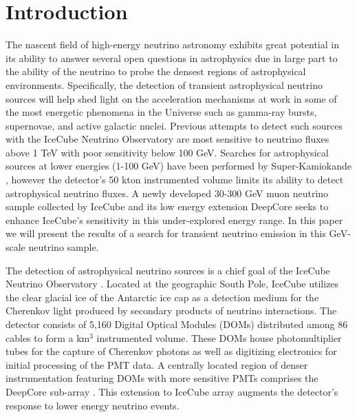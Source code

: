 \documentclass[manuscript]{aastex}
\begin{document}
\section{Introduction}
The nascent field of high-energy neutrino astronomy exhibits great potential in its ability to answer several open questions in astrophysics due in large part to the ability of the neutrino to probe the densest regions of astrophysical environments. Specifically, the detection of transient astrophysical neutrino sources will help shed light on the acceleration mechanisms at work in some of the most energetic phenomena in the Universe such as gamma-ray bursts, supernovae, and active galactic nuclei. Previous attempts to detect such sources with the IceCube Neutrino Observatory \citep{2006APh....26..155I} are most sensitive to neutrino fluxes above 1 TeV with poor sensitivity below 100 GeV. Searches for astrophysical sources at lower energies (1-100 GeV) have been performed by Super-Kamiokande \citep{2009ApJ...704..503T}, however the detector's 50 kton instrumented volume limits its ability to detect astrophysical neutrino fluxes. A newly developed 30-300 GeV muon neutrino sample collected by IceCube and its low energy extension DeepCore \citep{2012APh....35..615A} seeks to enhance IceCube's sensitivity in this under-explored energy range. In this paper we will present the results of a search for transient neutrino emission in this GeV-scale neutrino sample.

The detection of astrophysical neutrino sources is a chief goal of the IceCube Neutrino Observatory \citep{2006APh....26..155I}. Located at the geographic South Pole, IceCube utilizes the clear glacial ice of the Antarctic ice cap as a detection medium for the Cherenkov light produced by secondary products of neutrino interactions. The detector consists of 5,160 Digital Optical Modules (DOMs) distributed among 86 cables to form a km$^3$ instrumented volume. These DOMs house photomultiplier tubes for the capture of Cherenkov photons as well as digitizing electronics for initial processing of the PMT data. A centrally located region of denser instrumentation featuring DOMs with more sensitive PMTs comprises the DeepCore sub-array \citep{2012APh....35..615A}. This extension to IceCube array augments the detector's response to lower energy neutrino events.
\end{document}
